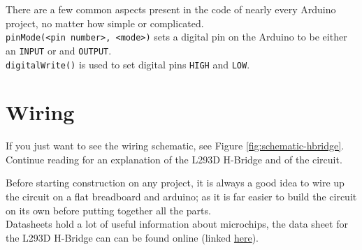 \documentclass[a4paper,12pt]{article}
\begin{document}
There are a few common aspects present in the code of nearly every Arduino project, no matter how simple or complicated. \\


\lstinline[]!pinMode(<pin number>, <mode>)! sets a digital pin on the Arduino to be either an \lstinline[]!INPUT! or and \lstinline[]!OUTPUT!. \\


\lstinline[]!digitalWrite()! is used to set digital pins \lstinline[]!HIGH! and \lstinline[]!LOW!.

\pagebreak
\section{Wiring} \label{wiring}
If you just want to see the wiring schematic, see Figure \ref{fig:schematic-hbridge}. Continue reading for an explanation of the L293D H-Bridge and of the circuit. 

\bigskip

Before starting construction on any project, it is always a good idea to wire up the circuit on a flat breadboard and arduino; as it is far easier to build the circuit on its own before putting together all the parts. \\

Datasheets hold a lot of useful information about microchips, the data sheet for the L293D H-Bridge can can be found online (linked \href{https://www.altronics.com.au/p/z2900-l293d-motor-drive-ic/}{here}).
\end{document}
